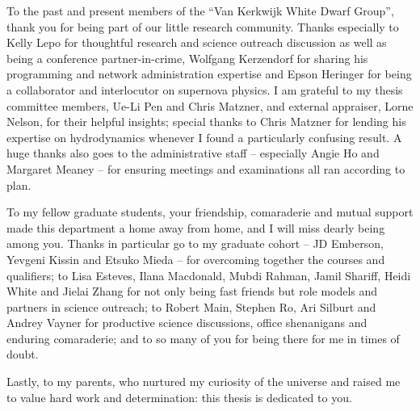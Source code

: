 \documentclass{ut-thesis}
\begin{document}
\begin{preliminary}
\begin{acknowledgements}

To the past and present members of the ``Van Kerkwijk White Dwarf Group'', thank you for being part of our little research community.  Thanks especially to Kelly Lepo for thoughtful research and science outreach discussion as well as being a conference partner-in-crime, Wolfgang Kerzendorf for sharing his programming and network administration expertise and Epson Heringer for being a collaborator and interlocutor on supernova physics.  I am grateful to my thesis committee members, Ue-Li Pen and Chris Matzner, and external appraiser, Lorne Nelson, for their helpful insights; special thanks to Chris Matzner for lending his expertise on hydrodynamics whenever I found a particularly confusing result.  A huge thanks also goes to the administrative staff -- especially Angie Ho and Margaret Meaney -- for ensuring meetings and examinations all ran according to plan.

To my fellow graduate students, your friendship, comaraderie and mutual support made this department a home away from home, and I will miss dearly being among you.  Thanks in particular go to my graduate cohort -- JD Emberson, Yevgeni Kissin and Etsuko Mieda -- for overcoming together the courses and qualifiers; to Lisa Esteves, Ilana Macdonald, Mubdi Rahman, Jamil Shariff, Heidi White and Jielai Zhang for not only being fast friends but role models and partners in science outreach; to Robert Main, Stephen Ro, Ari Silburt and Andrey Vayner for productive science discussions, office shenanigans and enduring comaraderie; and to so many of you for being there for me in times of doubt.

Lastly, to my parents, who nurtured my curiosity of the universe and raised me to value hard work and determination: this thesis is dedicated to you.

\end{acknowledgements}

\tableofcontents


\listoffigures


\end{preliminary}
\end{document}
